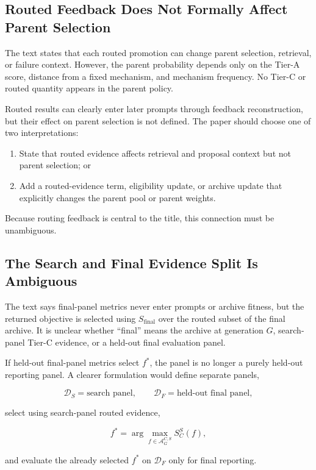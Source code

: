 \documentclass[11pt]{article}
\begin{document}
\subsection{Routed Feedback Does Not Formally Affect Parent Selection}

The text states that each routed promotion can change parent selection,
retrieval, or failure context. However, the parent probability depends only on
the Tier-A score, distance from a fixed mechanism, and mechanism frequency. No
Tier-C or routed quantity appears in the parent policy.

Routed results can clearly enter later prompts through feedback
reconstruction, but their effect on parent selection is not defined. The paper
should choose one of two interpretations:

\begin{enumerate}
  \item State that routed evidence affects retrieval and proposal context but
  not parent selection; or
  \item Add a routed-evidence term, eligibility update, or archive update that
  explicitly changes the parent pool or parent weights.
\end{enumerate}

Because routing feedback is central to the title, this connection must be
unambiguous.

\subsection{The Search and Final Evidence Split Is Ambiguous}

The text says final-panel metrics never enter prompts or archive fitness, but
the returned objective is selected using $S_{\mathrm{final}}$ over the routed
subset of the final archive. It is unclear whether ``final'' means the archive
at generation $G$, search-panel Tier-C evidence, or a held-out final evaluation
panel.

If held-out final-panel metrics select $f^*$, the panel is no longer a purely
held-out reporting panel. A clearer formulation would define separate panels,

\[
\mathcal D_S=\text{search panel},\qquad
\mathcal D_F=\text{held-out final panel},
\]

select using search-panel routed evidence,

\[
f^*=\arg\max_{f\in\mathcal A_G^{C,S}}S_C^S(f),
\]

and evaluate the already selected $f^*$ on $\mathcal D_F$ only for final
reporting.
\end{document}
